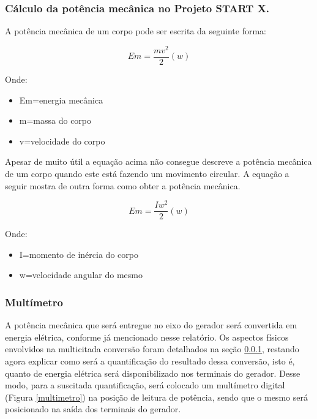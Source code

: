 \subsubsection{Cálculo da potência mecânica no Projeto START X.}
\label{calculo-da-potencia-mecanica}

A potência mecânica de um corpo pode ser escrita da seguinte forma:

\begin{equation}
  Em={\frac{mv^{2}}{2}}\left ( w \right )  
  \label{potencia-mecanica}
\end{equation}

Onde:

\begin{itemize}
  \item Em=energia mecânica
  \item m=massa do corpo 
  \item v=velocidade do corpo
\end{itemize}

Apesar de muito útil a equação acima não consegue descreve a potência mecânica de um corpo quando este está fazendo um movimento circular. A equação a seguir mostra de outra forma como obter a potência mecânica.

\begin{equation}
  Em=\frac{Iw^{2}}{2}\left ( w \right )
\label{potencia-mecanica-circular}
\end{equation}

Onde:

\begin{itemize}
  \item I=momento de inércia do corpo 
  \item w=velocidade angular do mesmo
\end{itemize}

\subsubsection{Multímetro}

A potência mecânica que será entregue no eixo do gerador será convertida em energia elétrica, conforme já mencionado nesse relatório. Os aspectos físicos envolvidos na multicitada conversão foram detalhados na seção \ref{calculo-da-potencia-mecanica}, restando agora explicar como será a quantificação do resultado dessa conversão, isto é, quanto de energia elétrica será disponibilizado nos terminais do gerador.  Desse modo, para a suscitada quantificação, será colocado um multímetro digital (Figura \ref{multimetro}) na posição de leitura de potência, sendo que o mesmo será posicionado na saída dos terminais do gerador.


